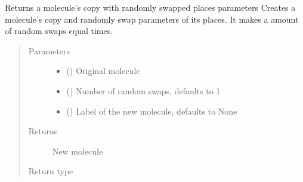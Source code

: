 \documentclass[letterpaper,10pt,english]{sphinxmanual}
\begin{document}
\begin{fulllineitems}
\label{\detokenize{molecular:molecular.swap_mutate}}
\sphinxAtStartPar
Returns a molecule’s copy with randomly swapped places parameters
Creates a molecule’s copy and randomly swap parameters of its places. It makes a amount of random swaps equal
times.
\begin{quote}\begin{description}
\item[{Parameters}] \leavevmode\begin{itemize}
\item {} 
\sphinxAtStartPar
{} ({\hyperref[\detokenize{molecular:molecular.Molecule}]{}}) \textendash{} Original molecule

\item {} 
\sphinxAtStartPar
{} (\sphinxstyleliteralemphasis{\sphinxupquote{, }}) \textendash{} Number of random swaps, defaults to 1

\item {} 
\sphinxAtStartPar
{} (\sphinxstyleliteralemphasis{\sphinxupquote{, }}) \textendash{} Label of the new molecule, defaults to None

\end{itemize}

\item[{Returns}] \leavevmode
\sphinxAtStartPar
New molecule

\item[{Return type}] \leavevmode
\sphinxAtStartPar
{\hyperref[\detokenize{molecular:molecular.Molecule}]{}}

\end{description}\end{quote}

\end{fulllineitems}
\end{document}
